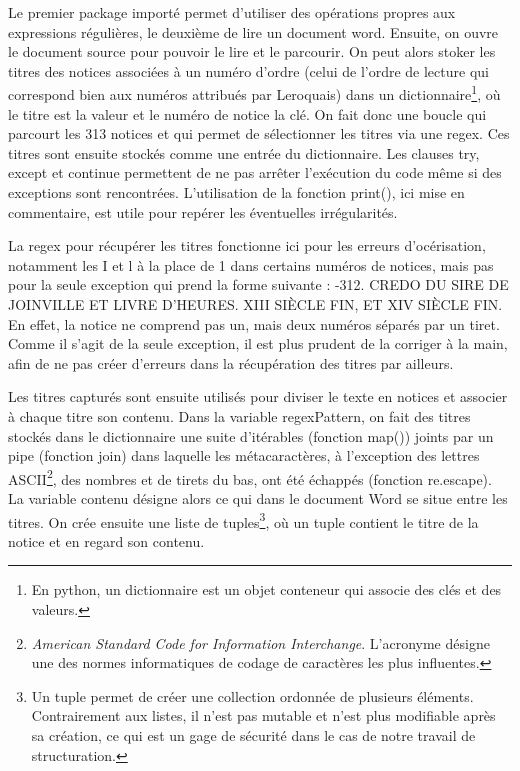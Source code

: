 \documentclass[a4paper,12pt,twoside]{book}
\begin{document}
Le premier package importé permet d'utiliser des opérations propres aux expressions régulières, le deuxième de lire un document word. Ensuite, on ouvre le document source pour pouvoir le lire et le parcourir. On peut alors stoker les titres des notices associées à un numéro d'ordre (celui de l'ordre de lecture qui correspond bien aux numéros attribués par Leroquais) dans un dictionnaire\footnote{En python, un dictionnaire est un objet conteneur qui associe des clés et des valeurs.}, où le titre est la valeur et le numéro de notice la clé. On fait donc une boucle qui parcourt les 313 notices et qui permet de sélectionner les titres via une regex. Ces titres sont ensuite stockés comme une entrée du dictionnaire. Les clauses \og try\fg{}, \og except\fg{} et \og continue\fg{} permettent de ne pas arrêter l'exécution du code même si des exceptions sont rencontrées. L'utilisation de la fonction print(), ici mise en commentaire, est utile pour repérer les éventuelles irrégularités.

La regex pour récupérer les titres fonctionne ici pour les erreurs d’océrisation, notamment les \og I\fg{} et \og l\fg{} à la place de 1 dans certains numéros de notices, mais pas pour la seule exception qui prend la forme suivante : -312. CREDO DU SIRE DE JOINVILLE ET LIVRE D’HEURES. XIII SIÈCLE FIN, ET XIV SIÈCLE FIN\fg{}. En effet, la notice ne comprend pas un, mais deux numéros séparés par un tiret. Comme il s’agit de la seule exception, il est plus prudent de la corriger à la main, afin de ne pas créer d’erreurs dans la récupération des titres par ailleurs. 

Les titres capturés sont ensuite utilisés pour diviser le texte en notices et associer à chaque titre son contenu. Dans la variable \og regexPattern\fg{}, on fait des titres stockés dans le dictionnaire une suite d'itérables (fonction map()) joints par un pipe (fonction join) dans laquelle les métacaractères, à l'exception des lettres ASCII\footnote{\textit{American Standard Code for Information Interchange}. L'acronyme désigne une des normes informatiques de codage de caractères les plus influentes.}, des nombres et de tirets du bas, ont été échappés (fonction re.escape). La variable contenu désigne alors ce qui dans le document Word se situe entre les titres. 
On crée ensuite une liste de tuples\footnote{Un tuple permet de créer une collection ordonnée de plusieurs éléments. Contrairement aux listes, il n'est pas mutable et n'est plus modifiable après sa création, ce qui est un gage de sécurité dans le cas de notre travail de structuration.}, où un tuple contient le titre de la notice et en regard son contenu. 
\end{document}
